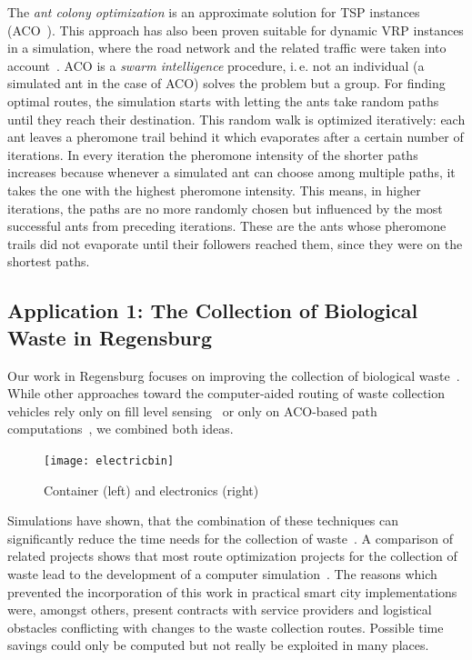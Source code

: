 \documentclass[10pt]{article}
\begin{document}
The {\it ant colony optimization} is an approximate solution for TSP
instances (ACO~\cite{Dorigo97}). This 
approach has also been proven suitable for dynamic VRP instances
in a simulation, where the road network and the related 
traffic were taken into account~\cite{Karadimas2008}. ACO is a {\it swarm intelligence}
procedure, i.\,e. not an individual (a simulated ant in the case of 
ACO) solves the problem but a group. For finding optimal routes,
the simulation starts with letting the ants take random paths
until they reach their destination. This random walk is optimized
iteratively: each ant leaves a pheromone trail behind it which
evaporates after a certain number of iterations. In every iteration
the pheromone intensity of the shorter paths increases because
whenever a simulated ant can choose among multiple paths, it takes
the one with the highest pheromone intensity. This means, in higher
iterations, the paths are no more randomly chosen but influenced 
by the most successful ants from preceding iterations. These are
the ants whose pheromone trails did not evaporate until their 
followers reached them, since they were on the shortest paths.


\subsection{Application 1: The Collection of Biological Waste in Regensburg}
\label{sec:Regensburg}

Our work in Regensburg focuses on improving the collection of biological waste~\cite{Burger18}.
While other approaches toward the computer-aided routing of waste collection vehicles 
rely only on fill level sensing~\cite{LundinOS17} or only on ACO-based path 
computations~\cite{ismail09}, we combined both ideas. 

\begin{figure}[h!]
    \centering
  \texttt{[image: electricbin]}
  \caption{Container (left) and electronics (right)}
  \label{fig:container}       %
\end{figure}

Simulations have shown, that 
the combination of these techniques can significantly reduce the time needs for the collection
of waste~\cite{Sharmin16}. A comparison of related projects shows that most route optimization projects for the collection of waste lead to the development of a 
computer simulation~\cite{likotiko17}. The reasons which prevented the incorporation
of this work in practical smart city implementations were, amongst others,  
present contracts with service providers and logistical
obstacles conflicting with changes to the waste collection routes. Possible time savings could only be computed but not really be exploited in many places.
\end{document}
